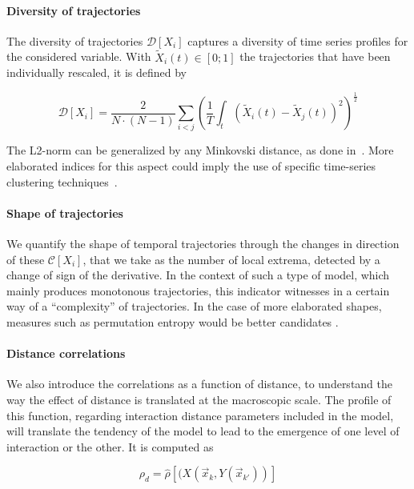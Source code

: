 \documentclass[graybox]{svmult}
\begin{document}
\paragraph{Diversity of trajectories}

The diversity of trajectories $\mathcal{D}\left[X_i\right]$ captures a diversity of time series profiles for the considered variable. With $\tilde{X}_i(t)\in \left[0;1\right]$ the trajectories that have been individually rescaled, it is defined by

\begin{equation}
\mathcal{D}\left[X_i\right] = \frac{2}{N\cdot(N-1)}\sum_{i<j} \left(\frac{1}{T}\int_{t} \left(\tilde{X}_i(t) - \tilde{X}_j(t)\right)^2 \right)^{\frac{1}{2}}
\end{equation}

The L2-norm can be generalized by any Minkovski distance, as done in~\cite{raimbault2016hybrid}. More elaborated indices for this aspect could imply the use of specific time-series clustering techniques~\cite{liao2005clustering}.


\paragraph{Shape of trajectories}

We quantify the shape of temporal trajectories through the changes in direction of these $\mathcal{C}\left[X_i\right]$, that we take as the number of local extrema, detected by a change of sign of the derivative. In the context of such a type of model, which mainly produces monotonous trajectories, this indicator witnesses in a certain way of a ``complexity'' of trajectories. In the case of more elaborated shapes, measures such as permutation entropy would be better candidates \cite{scarpino2017predictability}.
	
	
\paragraph{Distance correlations}

We also introduce the correlations as a function of distance, to understand the way the effect of distance is translated at the macroscopic scale. The profile of this function, regarding interaction distance parameters included in the model, will translate the tendency of the model to lead to the emergence of one level of interaction or the other. It is computed as

\begin{equation}
\rho_d = \hat{\rho}\left[(X(\vec{x}_k,Y(\vec{x}_{k'}))\right]
\end{equation}
\end{document}
